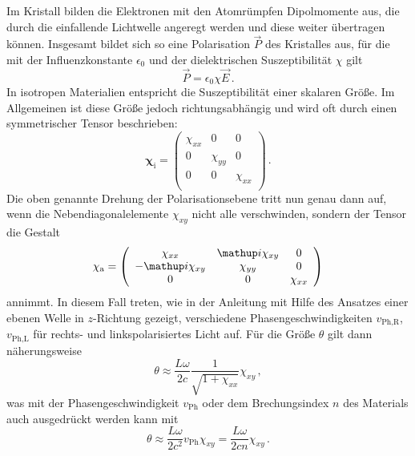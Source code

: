 Im Kristall bilden die Elektronen mit den Atomrümpfen Dipolmomente aus,
die durch die einfallende Lichtwelle angeregt werden und diese weiter
übertragen können.
Insgesamt bildet sich so eine Polarisation $\vec{P}$ des Kristalles aus,
für die mit der Influenzkonstante $\epsilon_0$ und der dielektrischen
Suszeptibilität $\chi$ gilt
\begin{equation}
    \label{eqn:polarisation}
    \vec{P} = \epsilon_0\chi\vec{E}\,.
\end{equation}
In isotropen Materialien entspricht die Suszeptibilität einer skalaren Größe.
Im Allgemeinen ist diese Größe jedoch richtungsabhängig und wird oft
durch einen symmetrischer Tensor beschrieben:
\begin{equation}
    \label{eqn:suszeptibilitaet_inaktiv}
    \mathbf{\chi}_\text{i} =
    \left(\begin{array}{ccc}
        \chi_{xx} & 0 & 0 \\
        0 & \chi_{yy} & 0 \\
        0 & 0 & \chi_{xx} \\
    \end{array}\right)\,.
\end{equation}
Die oben genannte Drehung der Polarisationsebene tritt nun genau dann auf, wenn
die Nebendiagonalelemente $\chi_{xy}$ nicht alle verschwinden, sondern der
Tensor die Gestalt
\begin{equation}
    \label{eqn:suszeptibilitaet_aktiv}
    \mathbf{\chi}_\text{a} =
    \left(\begin{array}{ccc}
        \chi_{xx}    & \i\chi_{xy} & 0 \\
        -\i\chi_{xy} & \chi_{yy}   & 0 \\
        0            & 0           & \chi_{xx} \\
    \end{array}\right)
\end{equation}
annimmt. In diesem Fall treten, wie in der Anleitung \cite{V46} mit Hilfe
des Ansatzes einer ebenen Welle in $z$-Richtung gezeigt, verschiedene
Phasengeschwindigkeiten $v_\text{Ph,R}$, $v_\text{Ph,L}$ für rechts- und
linkspolarisiertes Licht auf.
Für die Größe $\theta$ gilt dann näherungsweise
\begin{equation}
    \label{eqn:theta_cirkular}
    \theta \approx \frac{L\omega}{2c}\frac{1}{\sqrt{1+\chi_{xx}}}\chi_{xy}\,,
\end{equation}
was mit der Phasengeschwindigkeit $v_\text{Ph}$ oder dem Brechungsindex $n$
des Materials auch ausgedrückt werden kann mit
\begin{equation}
    \label{eqn:theta_n}
    \theta
    \approx \frac{L\omega}{2c^2}v_\text{Ph}\chi_{xy}
    = \frac{L\omega}{2cn}\chi_{xy}\,.
\end{equation}

